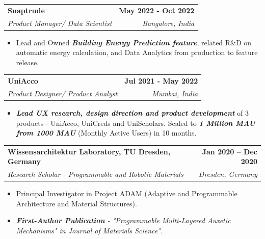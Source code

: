 \documentclass[letterpaper,11pt]{article}
\makeatletter
\newcommand{\resumeItem}[1]{
  \item\small{
    {#1 \vspace{-2pt}}
  }
}
\newcommand{\resumeSubheading}[4]{
  \vspace{-2pt}\item
    \begin{tabular*}{1.0\textwidth}[t]{l@{\extracolsep{\fill}}r}
      \textbf{#1} & \textbf{\small #2} \\
      \textit{\small#3} & \textit{\small #4} \\
    \end{tabular*}\vspace{-7pt}
}
\newcommand{\resumeSubHeadingListStart}{\begin{itemize}[leftmargin=0.0in, label={}]}
\newcommand{\resumeSubHeadingListEnd}{\end{itemize}}
\newcommand{\resumeItemListStart}{\begin{itemize}}
\newcommand{\resumeItemListEnd}{\end{itemize}\vspace{-5pt}}
\makeatother
\begin{document}
    \resumeSubheading
      {Snaptrude}{May 2022 - Oct 2022}
      {Product Manager/ Data Scientist}{Bangalore, India}
      \resumeItemListStart
        \resumeItem{Lead and Owned \textit{\textbf{Building Energy Prediction feature}}, related R\&D on automatic energy calculation, and Data Analytics from production to feature release.}
        
    \resumeItemListEnd

    \resumeSubheading
      {UniAcco}{Jul 2021 - May 2022}
      {Product Designer/ Product Analyst}{Mumbai, India}
      \resumeItemListStart
        \resumeItem{\textit{\textbf{Lead UX research, design direction and product development}} of 3 products - UniAcco, UniCreds and UniScholars. Scaled to \textit{\textbf{1 Million MAU from 1000 MAU}} (Monthly Active Users) in 10 months.}
    \resumeItemListEnd

    
    






    \resumeSubheading
      {Wissensarchitektur Laboratory, TU Dresden, Germany}{Jan 2020 -- Dec 2020}
      {Research Scholar - Programmable and Robotic Materials}{Dresden, Germany}
      \resumeItemListStart
        \resumeItem{Principal Investigator in Project ADAM (Adaptive and Programmable Architecture and Material Structures).}
        \resumeItem{\textit{\textbf{First-Author Publication} - "Programmable Multi-Layered Auxetic Mechanisms" in Journal of Materials Science".}}
    \resumeItemListEnd
\end{document}
